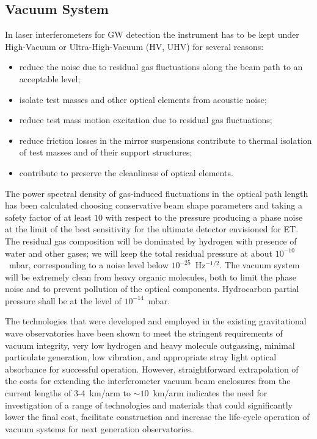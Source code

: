 \subsection{Vacuum System}
\label{Sec:Vacuum}
In laser interferometers for GW detection the instrument has to be kept under High-Vacuum or Ultra-High-Vacuum (HV, UHV) for several reasons: 
\begin{itemize}
\item reduce the noise due to residual gas fluctuations along the beam path to an acceptable level; \item isolate test masses and other optical elements from acoustic noise; 
\item reduce test mass motion excitation due to residual gas fluctuations;
\item reduce friction losses in the mirror suspensions  contribute to thermal isolation of test masses and of their support structures; 
\item contribute to preserve the cleanliness of optical elements. 
\end{itemize}
The power spectral density of gas-induced fluctuations in the optical path length has been calculated choosing conservative beam shape parameters and taking a safety factor of at least $10$ with respect to the pressure producing a phase noise at the limit of the best sensitivity for the ultimate detector envisioned for ET.
The residual gas composition will be dominated by hydrogen with presence of water and other gases; we will keep the total residual pressure at about $10^{-10}$~mbar, corresponding to a noise level below $10^{-25}$~Hz$^{-1/2}$.
The vacuum system will be extremely clean from heavy organic molecules, both to limit the phase noise and to prevent pollution of the optical components. Hydrocarbon partial pressure shall be at the level of $10^{-14}$~mbar.

The technologies that were developed and employed in the existing gravitational wave observatories have been shown to meet the stringent requirements of vacuum integrity, very low hydrogen and heavy molecule outgassing, minimal particulate generation, low vibration, and appropriate stray light optical absorbance for successful operation. However, straightforward extrapolation of the costs for extending the interferometer vacuum beam enclosures from the current lengths of 3-4~km/arm to $\sim10$~km/arm indicates the need for investigation of a range of technologies and materials that could significantly lower the final cost, facilitate construction and increase the life-cycle operation of vacuum systems for next generation observatories. 

